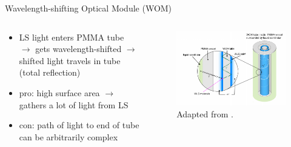 \documentclass[aspectratio=169]{beamer}
\begin{document}
	\begin{frame}{Wavelength-shifting Optical Module (WOM)}
		\vspace{-1cm}
		
		\begin{columns}
			
			\begin{column}{0.3\textwidth}
				\begin{itemize}
					\item LS light enters PMMA tube $\rightarrow$ gets wavelength-shifted $\rightarrow$ shifted light travels in tube (total reflection)
					\item pro: high surface area $\rightarrow$ gathers a lot of light from LS
					\item con: path of light to end of tube can be arbitrarily complex
				\end{itemize}
				
			\end{column}
		
		
			\begin{column}{0.7\textwidth}
				\begin{figure}
					\centering
					\includegraphics[width=.9\textwidth]{pictures/wom-principle.pdf}
					\caption{Adapted from \cite{ZIMMERMANN}.}
				\end{figure}
				
			\end{column}
		
		\end{columns}


	\end{frame}
	
\end{document}
